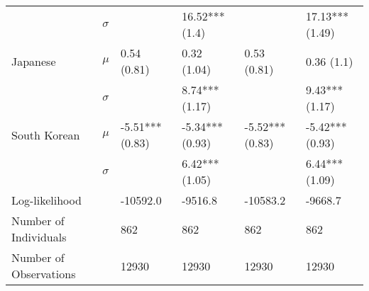 \begin{tabular}{llllll}
                          &  $\sigma$ &                               &                16.52*** (1.4) &                                &                17.13*** (1.49) \\
                 Japanese &     $\mu$ &                   0.54 (0.81) &                   0.32 (1.04) &                    0.53 (0.81) &                     0.36 (1.1) \\
                          &  $\sigma$ &                               &                8.74*** (1.17) &                                &                 9.43*** (1.17) \\
             South Korean &     $\mu$ &               -5.51*** (0.83) &               -5.34*** (0.93) &                -5.52*** (0.83) &                -5.42*** (0.93) \\
                          &  $\sigma$ &                               &                6.42*** (1.05) &                                &                 6.44*** (1.09) \\
    \hline Log-likelihood &           &                      -10592.0 &                       -9516.8 &                       -10583.2 &                        -9668.7 \\
    Number of Individuals &           &                           862 &                           862 &                            862 &                            862 \\
   Number of Observations &           &                         12930 &                         12930 &                          12930 &                          12930 \\
\bottomrule
\end{tabular}
